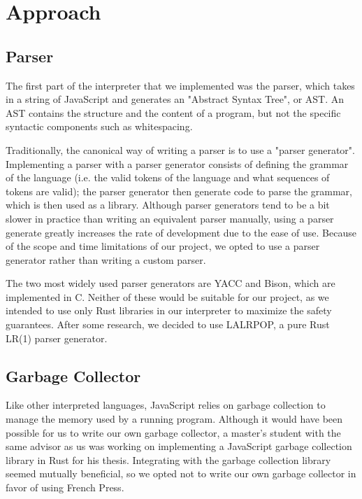 \documentclass{article}
\begin{document}
\section*{Approach}

\subsection*{Parser}

The first part of the interpreter that we implemented was the parser, which
takes in a string of JavaScript and generates an "Abstract Syntax Tree", or AST.
An AST contains the structure and the content of a program, but not the specific
syntactic components such as whitespacing. \newline

Traditionally, the canonical way of writing a parser is to use a "parser
generator". Implementing a parser with a parser generator consists of defining
the grammar of the language (i.e. the valid tokens of the language and what
sequences of tokens are valid); the parser generator then generate code to parse
the grammar, which is then used as a library. Although parser generators tend to
be a bit slower in practice than writing an equivalent parser manually, using
a parser generate greatly increases the rate of development due to the ease of
use. Because of the scope and time limitations of our project, we opted to use a
parser generator rather than writing a custom parser.

The two most widely used parser generators are YACC and Bison, which are
implemented in C. Neither of these would be suitable for our project, as we
intended to use only Rust libraries in our interpreter to maximize the safety
guarantees. After some research, we decided to use LALRPOP, a pure Rust LR(1)
parser generator\cite{lalrpop}.

\subsection*{Garbage Collector}

Like other interpreted languages, JavaScript relies on garbage collection to
manage the memory used by a running program. Although it would have been
possible for us to write our own garbage collector, a master's student
with the same advisor as us was working on implementing a JavaScript garbage
collection library in Rust for his thesis. Integrating with the garbage
collection library seemed mutually beneficial, so we opted not to write our own
garbage collector in favor of using French Press.
\end{document}
